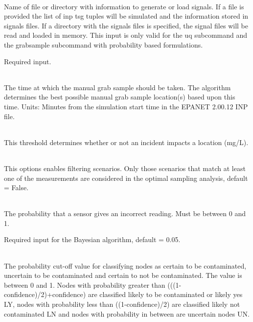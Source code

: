 \begin{description}[topsep=0pt,parsep=0.5em,itemsep=-0.4em]
  \item[{scenario}]\hfill
  \begin{description}[topsep=0pt,parsep=0.5em,itemsep=-0.4em]
    \item[{signals}]\hfill
\\Name of file or directory with information to generate 
                or load signals. If a file is provided the list of inp tsg tuples
                 will be simulated and the information stored in signals files. If
                a directory with the signals files is specified, the signal files will
                be read and loaded in memory. This input is only valid for the uq
                subcommand and the grabsample subcommand with probability based formulations.

                Required input.
  \end{description}
  \item[{uq}]\hfill
  \begin{description}[topsep=0pt,parsep=0.5em,itemsep=-0.4em]
    \item[{analysis time}]\hfill
\\The time at which the manual grab sample should be taken. 
                The algorithm determines the best possible manual grab sample location(s)
                based upon this time. Units: Minutes from the simulation start time in the
                EPANET 2.00.12 INP file.
    \item[{threshold}]\hfill
      \\This threshold determines whether or not an incident impacts a
      location (mg/L).
    \item[{filter scenarios}]\hfill
\\ This options enables filtering scenarios. Only those scenarios 
                that match at least one of the measurements are considered
                in the optimal sampling analysis, default = False.
    \item[{measurement failure}]\hfill
\\The probability that a sensor gives an incorrect reading. Must be between 0 and 1. 
                
                Required input for the Bayesian algorithm, default = 0.05.
    \item[{confidence}]\hfill
\\The probability cut-off value for classifying nodes as certain to be contaminated, 
                uncertain to be contaminated and certain to not be contaminated. The value is 
                between 0 and 1. Nodes with probability greater than (((1-confidence)/2)+confidence) are 
                classified likely to be contaminated or likely yes LY, 
                nodes with probability less than ((1-confidence)/2) are classified likely not contaminated
                LN and nodes with probability in between are uncertain nodes UN.
                

\end{description}
\end{description}
